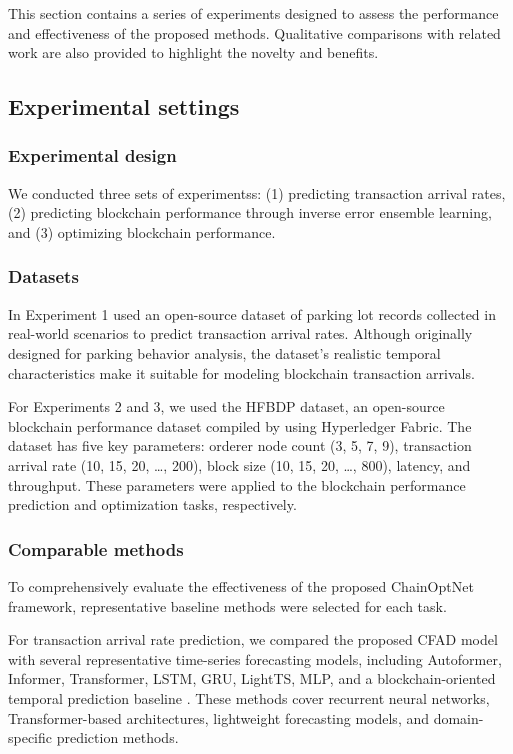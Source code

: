 \documentclass[a4paper,fleqn]{cas-dc}
\begin{document}
This section contains a series of experiments designed to assess the performance and effectiveness of the proposed methods. Qualitative comparisons with related work are also provided to highlight the novelty and benefits.

\subsection{Experimental settings}
\vspace{6pt}
\subsubsection{Experimental design}
\vspace{6pt}
We conducted three sets of experimentss:
(1) predicting transaction arrival rates, (2) predicting blockchain performance through inverse error ensemble learning, and (3) optimizing blockchain performance.

\subsubsection{Datasets}
\vspace{6pt}
In Experiment 1 used an open-source dataset of parking lot records collected in real-world scenarios to predict transaction arrival rates. Although originally designed for parking behavior analysis, the dataset's realistic temporal characteristics make it suitable for modeling blockchain transaction arrivals.

For Experiments 2 and 3, we used the HFBDP dataset, an open-source blockchain performance dataset compiled by \citep{wang2023learningchain} using Hyperledger Fabric. The dataset has five key parameters: orderer node count ({3, 5, 7, 9}), transaction arrival rate ({10, 15, 20, \ldots, 200}), block size ({10, 15, 20, \ldots, 800}), latency, and throughput. These parameters were applied to the blockchain performance prediction and optimization tasks, respectively.

\subsubsection{Comparable methods}
\vspace{6pt}
To comprehensively evaluate the effectiveness of the proposed ChainOptNet framework, representative baseline methods were selected for each task.

For transaction arrival rate prediction, we compared the proposed CFAD model with several representative time-series forecasting models, including Autoformer, Informer, Transformer, LSTM, GRU, LightTS, MLP, and a blockchain-oriented temporal prediction baseline \citep{wang2023learningchain}. These methods cover recurrent neural networks, Transformer-based architectures, lightweight forecasting models, and domain-specific prediction methods.
\end{document}

